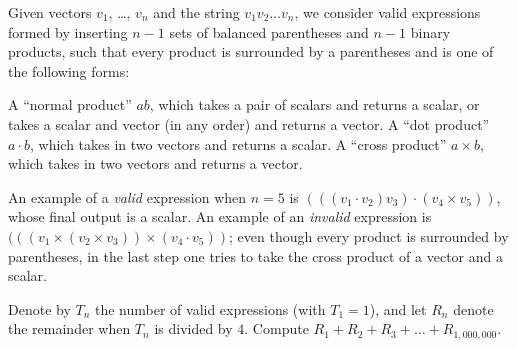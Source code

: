 Given vectors $v_1$, \dots, $v_n$ and the string $v_1v_2 \dots v_n$,
we consider valid expressions formed by inserting $n-1$ sets of balanced parentheses and $n-1$ binary products,
such that every product is surrounded by a parentheses and is one of the following forms:
\begin{itemize}
	\ii A ``normal product'' $ab$, which takes a pair of scalars and returns a scalar, or takes a scalar and vector (in any order) and returns a vector.
	\ii A ``dot product'' $a \cdot b$, which takes in two vectors and returns a scalar.
	\ii A ``cross product'' $a \times b$, which takes in two vectors and returns a vector.
\end{itemize}
An example of a \emph{valid} expression when $n=5$ is $(((v_1 \cdot v_2)v_3) \cdot (v_4 \times v_5))$, whose final output is a scalar. An example of an \emph{invalid} expression is $(((v_1 \times (v_2 \times v_3)) \times (v_4 \cdot v_5))$; even though every product is surrounded by parentheses, in the last step one tries to take the cross product of a vector and a scalar.

Denote by $T_n$ the number of valid expressions (with $T_1 = 1$), and let $R_n$
denote the remainder when $T_n$ is divided by $4$.
Compute $R_1 + R_2 + R_3 + \ldots + R_{1,000,000}$.
